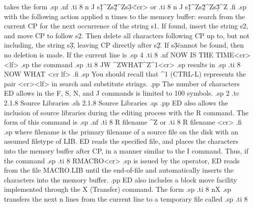 takes the form
.sp
.nf
.ti 8
n J s\d1\u^Zs\d2\u^Zs\d3\u <cr>
or
.ti 8
n J s\d1\u^Zs\d2\u^Zs\d3\u ^Z
.fi
.sp
with the following action applied n times to the memory buffer: search from 
the current CP for the next occurrence of the string s1.  If found, 
insert the string s2, and move CP to follow s2.  Then delete all 
characters following CP up to, but not including, the string s\d3\u, leaving 
CP directly after s\d2\u.  If s\d3\u cannot be found, then no deletion is 
made.  If the current line is 
.sp 4
.ti 8
.nf
NOW IS THE TIME<cr><lf>
.sp
the command
.sp
.ti 8
JW ^ZWHAT^Z^1<cr>
.sp
results in
.sp
.ti 8
NOW WHAT <cr lf>
.fi
.sp
You should recall that ^1 (CTRL-L) represents the pair 
<cr><lf> in search and substitute strings.
.pp
The number of characters ED allows in the F, S, N, and J 
commands is limited to 100 symbols.
.sp 2
.tc         2.1.8  Source Libraries
.sh
2.1.8  Source Libraries
.qs
.pp 
ED also allows the inclusion of source libraries during the 
editing process with the R command.  The form of this command is
.sp
.nf
.ti 8
R filename ^Z
or
.ti 8
R filename <cr>
.fi
.sp
where filename is the primary filename of a source file on the 
disk with an assumed filetype of LIB.  ED reads the specified 
file, and places the characters into the memory buffer after CP, 
in a manner similar to the I command.  Thus, if the command
.sp
.ti 8
RMACRO<cr>
.sp
is issued by the operator, ED reads from the file MACRO.LIB until 
the end-of-file and automatically inserts the characters into the 
memory buffer.
.pp
ED also includes a block move facility implemented through the 
X (Transfer) command.  The form
.sp
.ti 8
nX
.sp
transfers the next n lines from the current line to a temporary 
file called
.sp
.ti 8
